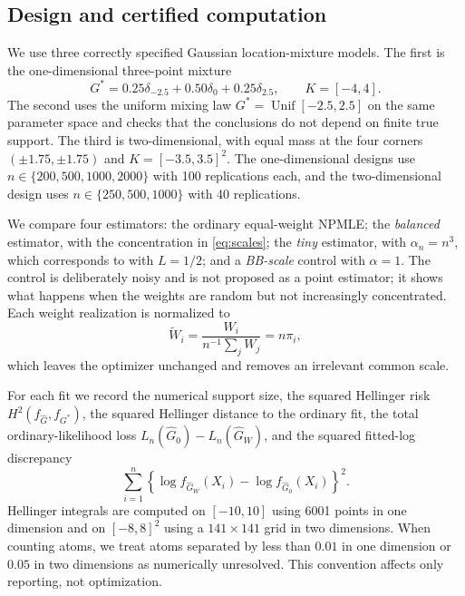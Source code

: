 \documentclass[11pt]{article}
\theoremstyle{definition}
\theoremstyle{remark}
\begin{document}
\subsection{Design and certified computation}

We use three correctly specified Gaussian location-mixture models.  The first
is the one-dimensional three-point mixture
\[
 G^*=0.25\delta_{-2.5}+0.50\delta_0+0.25\delta_{2.5},
 \qquad K=[-4,4].
\]
The second uses the uniform mixing law $G^*=\operatorname{Unif}[-2.5,2.5]$ on
the same parameter space and checks that the conclusions do not depend on
finite true support.  The third is two-dimensional, with equal mass at the
four corners $(\pm1.75,\pm1.75)$ and $K=[-3.5,3.5]^2$.  The one-dimensional
designs use $n\in\{200,500,1000,2000\}$ with 100 replications each, and the
two-dimensional design uses $n\in\{250,500,1000\}$ with 40 replications.

We compare four estimators: the ordinary equal-weight NPMLE; the
\emph{balanced} estimator, with the concentration in \eqref{eq:scales}; the
\emph{tiny} estimator, with $\alpha_n=n^3$, which corresponds to
 with $L=1/2$; and a \emph{BB-scale} control with $\alpha=1$.
The control is deliberately noisy and is not proposed as a point estimator;
it shows what happens when the weights are random but not increasingly
concentrated.  Each weight realization is normalized to
\[
 \widetilde W_i=\frac{W_i}{n^{-1}\sum_jW_j}=n\pi_i,
\]
which leaves the optimizer unchanged and removes an irrelevant common scale.

For each fit we record the numerical support size, the squared Hellinger risk
$H^2(f_{\widehat G},f_{G^*})$, the squared Hellinger distance to the ordinary
fit, the total ordinary-likelihood loss
$L_n(\widehat G_0)-L_n(\widehat G_W)$, and the squared fitted-log
discrepancy
\[
 \sum_{i=1}^n\left\{
 \log f_{\widehat G_W}(X_i)-\log f_{\widehat G_0}(X_i)
 \right\}^2.
\]
Hellinger integrals are computed on $[-10,10]$ using 6001 points in one
dimension and on $[-8,8]^2$ using a $141\times141$ grid in two dimensions.
When counting atoms, we treat atoms separated by less than $0.01$ in one
dimension or $0.05$ in two dimensions as numerically unresolved.  This
convention affects only reporting, not optimization.
\end{document}
